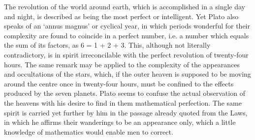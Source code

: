 \documentclass[11pt,letter]{article}
\begin{document}
\par  The revolution of the world around earth, which is accomplished in a single day and night, is described as being the most perfect or intelligent. Yet Plato also speaks of an ‘annus magnus’ or cyclical year, in which periods wonderful for their complexity are found to coincide in a perfect number, i.e. a number which equals the sum of its factors, as 6 = 1 + 2 + 3. This, although not literally contradictory, is in spirit irreconcilable with the perfect revolution of twenty-four hours. The same remark may be applied to the complexity of the appearances and occultations of the stars, which, if the outer heaven is supposed to be moving around the centre once in twenty-four hours, must be confined to the effects produced by the seven planets. Plato seems to confuse the actual observation of the heavens with his desire to find in them mathematical perfection. The same spirit is carried yet further by him in the passage already quoted from the Laws, in which he affirms their wanderings to be an appearance only, which a little knowledge of mathematics would enable men to correct.
\end{document}
